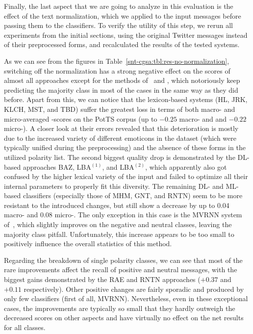 Finally, the last aspect that we are going to analyze in this
evaluation is the effect of the text normalization, which we applied
to the input messages before passing them to the classifiers.  To
verify the utility of this step, we rerun all experiments from the
initial sections, using the original Twitter messages instead of their
preprocessed forms, and recalculated the results of the tested
systems.

As we can see from the figures in
Table~\ref{snt-cgsa:tbl:res-no-normalization}, switching off the
normalization has a strong negative effect on the scores of almost all
approaches except for the methods of~\citet{Yessenalina:10} and
\citet{Socher:12,Socher:13}, which notoriously keep predicting the
majority class in most of the cases in the same way as they did
before.  Apart from this, we can notice that the lexicon-based systems
(HL, JRK, KLCH, MST, and TBD) suffer the greatest loss in terms of
both macro- and micro-averaged \F{}-scores on the PotTS corpus (up to
$-0.25$ macro- and and $-0.22$ micro-\F{}).  A closer look at their
errors revealed that this deterioration is mostly due to the increased
variety of different emoticons in the dataset (which were typically
unified during the preprocessing) and the absence of these forms in
the utilized polarity list.  The second biggest quality drop is
demonstrated by the DL-based approaches BAZ, LBA$^{(1)}$, and
LBA$^{(2)}$, which apparently also got confused by the higher lexical
variety of the input and failed to optimize all their internal
parameters to properly fit this diversity.  The remaining DL- and
ML-based classifiers (especially those of MHM, GNT, and RNTN) seem to
be more resistant to the introduced changes, but still show a decrease
by up to 0.04 macro- and 0.08 micro-\F{}.  The only exception in this
case is the MVRNN system of~\citet{Socher:12}, which slightly improves
on the negative and neutral classes, leaving the majority class
pitfall.  Unfortunately, this increase appears to be too small to
positively influence the overall statistics of this method.

Regarding the breakdown of single polarity classes, we can see that
most of the rare improvements affect the recall of positive and
neutral messages, with the biggest gains demonstrated by the RAE and
RNTN approaches ($+0.37$ and $+0.11$ respectively).  Other positive
changes are fairly sporadic and produced by only few classifiers
(first of all, MVRNN).  Nevertheless, even in these exceptional cases,
the improvements are typically so small that they hardly outweigh the
decreased scores on other aspects and have virtually no effect on the
net results for all classes.

